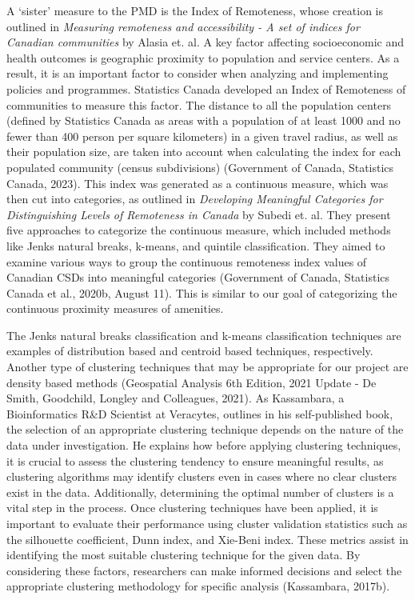 \documentclass[11pt, a4paper]{article}
\begin{document}
A `sister' measure to the PMD is the Index of Remoteness, whose creation is outlined in \textit{Measuring remoteness and accessibility - A set of indices for Canadian communities} by Alasia et. al. A key factor affecting socioeconomic and health outcomes is geographic proximity to population and service centers. As a result, it is an important factor to consider when analyzing and implementing policies and programmes. Statistics Canada developed an Index of Remoteness of communities to measure this factor. The distance to all the population centers (defined by Statistics Canada as areas with a population of at least 1000 and no fewer than 400 person per square kilometers) in a given travel radius, as well as their population size, are taken into account when calculating the index for each populated community (census subdivisions) (Government of Canada, Statistics Canada, 2023). This index was generated as a continuous measure, which was then cut into categories, as outlined in \textit{Developing Meaningful Categories for Distinguishing Levels of Remoteness in Canada} by Subedi et. al. They present five approaches to categorize the continuous measure, which included methods like Jenks natural breaks, k-means, and quintile classification. They aimed to examine various ways to group the continuous remoteness index values of Canadian CSDs into meaningful categories (Government of Canada, Statistics Canada et al., 2020b, August 11). This is similar to our goal of categorizing the continuous proximity measures of amenities.
\par
The Jenks natural breaks classification and k-means classification techniques are examples of distribution based and centroid based techniques, respectively. Another type of clustering techniques that may be appropriate for our project are density based methods (Geospatial Analysis 6th Edition, 2021 Update - De Smith, Goodchild, Longley and Colleagues, 2021). As Kassambara, a Bioinformatics R\&D Scientist at Veracytes, outlines in his self-published book, the selection of an appropriate clustering technique depends on the nature of the data under investigation. He explains how before applying clustering techniques, it is crucial to assess the clustering tendency to ensure meaningful results, as clustering algorithms may identify clusters even in cases where no clear clusters exist in the data. Additionally, determining the optimal number of clusters is a vital step in the process. Once clustering techniques have been applied, it is important to evaluate their performance using cluster validation statistics such as the silhouette coefficient, Dunn index, and Xie-Beni index. These metrics assist in identifying the most suitable clustering technique for the given data. By considering these factors, researchers can make informed decisions and select the appropriate clustering methodology for specific analysis (Kassambara, 2017b).
\end{document}

